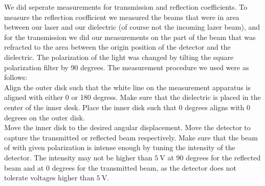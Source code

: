 We did seperate measurements for transmission and reflection coefficients. To measure the reflection coefficient we measured the beams that were in area between our laser and our dielectric (of course not the incoming lazer beam), and for the transmission we did our measurements on the part of the beam that was refracted to the area between the origin position of the detector and the dielectric. The polarization of the light was changed by tilting the square polarization filter by 90 degrees. The measurement procedure we used were as follows:\\

Align the outer disk such that the white line on the measurement apparatus is aligned with either 0 or 180 degress. Make sure that the dielectric is placed in the center of the inner desk. Place the inner disk such that 0 degrees aligns with 0 degrees on the outer disk.\\

Move the inner disk to the desired angular displacement. Move the detector to capture the transmitted or reflected beam respectively. Make sure that the beam of with given polarization is intense enough by tuning the intensity of the detector. The intensity may not be higher than $\SI{5}{\volt}$ at 90 degrees for the reflected beam and at 0 degrees for the transmitted beam, as the detector does not tolerate voltages higher than $\SI{5}{\volt}$. 
